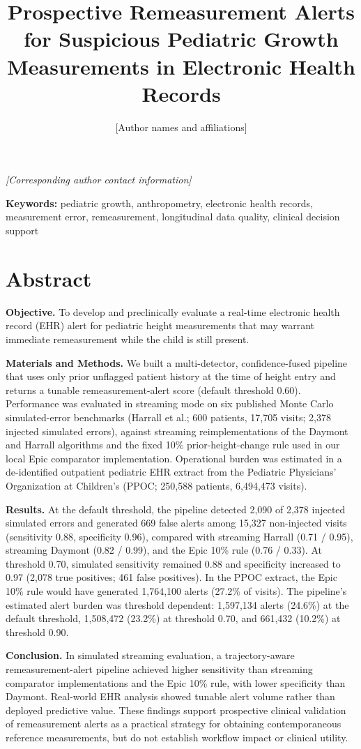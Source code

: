\documentclass[11pt]{article}
\title{Prospective Remeasurement Alerts for Suspicious Pediatric Growth Measurements in Electronic Health Records}
\author{[Author names and affiliations]}
\date{}
\begin{document}
\maketitle
\noindent\emph{[Corresponding author contact information]}

\noindent\textbf{Keywords:} pediatric growth, anthropometry, electronic health records, measurement error, remeasurement, longitudinal data quality, clinical decision support

\section*{Abstract}

\textbf{Objective.} To develop and preclinically evaluate a real-time electronic health record (EHR) alert for pediatric height measurements that may warrant immediate remeasurement while the child is still present.

\textbf{Materials and Methods.} We built a multi-detector, confidence-fused pipeline that uses only prior unflagged patient history at the time of height entry and returns a tunable remeasurement-alert score (default threshold 0.60). Performance was evaluated in streaming mode on six published Monte Carlo simulated-error benchmarks (Harrall et al.; 600 patients, 17,705 visits; 2,378 injected simulated errors), against streaming reimplementations of the Daymont and Harrall algorithms and the fixed 10\% prior-height-change rule used in our local Epic comparator implementation. Operational burden was estimated in a de-identified outpatient pediatric EHR extract from the Pediatric Physicians' Organization at Children's (PPOC; 250,588 patients, 6,494,473 visits).

\textbf{Results.} At the default threshold, the pipeline detected 2,090 of 2,378 injected simulated errors and generated 669 false alerts among 15,327 non-injected visits (sensitivity 0.88, specificity 0.96), compared with streaming Harrall (0.71 / 0.95), streaming Daymont (0.82 / 0.99), and the Epic 10\% rule (0.76 / 0.33). At threshold 0.70, simulated sensitivity remained 0.88 and specificity increased to 0.97 (2,078 true positives; 461 false positives). In the PPOC extract, the Epic 10\% rule would have generated 1,764,100 alerts (27.2\% of visits). The pipeline's estimated alert burden was threshold dependent: 1,597,134 alerts (24.6\%) at the default threshold, 1,508,472 (23.2\%) at threshold 0.70, and 661,432 (10.2\%) at threshold 0.90.

\textbf{Conclusion.} In simulated streaming evaluation, a trajectory-aware remeasurement-alert pipeline achieved higher sensitivity than streaming comparator implementations and the Epic 10\% rule, with lower specificity than Daymont. Real-world EHR analysis showed tunable alert volume rather than deployed predictive value. These findings support prospective clinical validation of remeasurement alerts as a practical strategy for obtaining contemporaneous reference measurements, but do not establish workflow impact or clinical utility.
\end{document}
